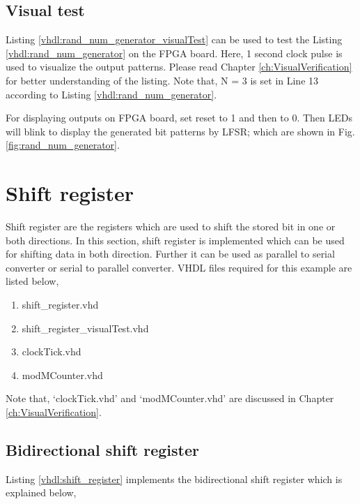 

\subsection{Visual test}
Listing \ref{vhdl:rand_num_generator_visualTest} can be used to test the Listing \ref{vhdl:rand_num_generator} on the FPGA board. Here, 1 second clock pulse is used to visualize the output patterns. Please read Chapter \ref{ch:VisualVerification} for better understanding of the listing. Note that,  N = 3 is set in Line 13 according to Listing \ref{vhdl:rand_num_generator}.

For displaying outputs on FPGA board, set reset to 1 and then to 0. Then LEDs will blink to display the generated bit patterns by LFSR; which are shown in Fig. \ref{fig:rand_num_generator}. 




\section{Shift register}
Shift register are the registers which  are used to shift the stored bit in one or both directions. In this section, shift register is implemented which can be used for shifting data in both direction. Further it can be used as parallel to serial converter or serial to parallel converter. VHDL files required for this example are listed below, 
\begin{enumerate}
	\item shift\_register.vhd
	\item shift\_register\_visualTest.vhd
	\item clockTick.vhd
	\item modMCounter.vhd
\end{enumerate}
Note that, `clockTick.vhd' and `modMCounter.vhd' are discussed in Chapter \ref{ch:VisualVerification}.

\subsection{Bidirectional shift register}
Listing \ref{vhdl:shift_register} implements the bidirectional shift register which is explained below, 

